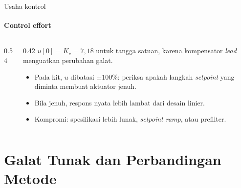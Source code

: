 \documentclass[aspectratio=169,10pt]{beamer}
\begin{document}
\begin{frame}{Usaha kontrol}
	\framesubtitle{Control effort}
	\begin{columns}[c]
		\begin{column}{0.54\textwidth}
			\centering
		\end{column}
		\begin{column}{0.42\textwidth}
			\small
			$u[0] = K_c = 7{,}18$ untuk tangga satuan, karena kompensator \textit{lead} menguatkan perubahan galat.
			\begin{itemize}
				\item Pada kit, $u$ dibatasi $\pm100\%$: periksa apakah langkah \textit{setpoint} yang diminta membuat aktuator jenuh.
				\item Bila jenuh, respons nyata lebih lambat dari desain linier.
				\item Kompromi: spesifikasi lebih lunak, \textit{setpoint ramp}, atau prefilter.
			\end{itemize}
		\end{column}
	\end{columns}
\end{frame}

\section{Galat Tunak dan Perbandingan Metode\texorpdfstring{\\[4pt]{\Large{}}}{ / Steady-State Error and Method Comparison}}
\end{document}
